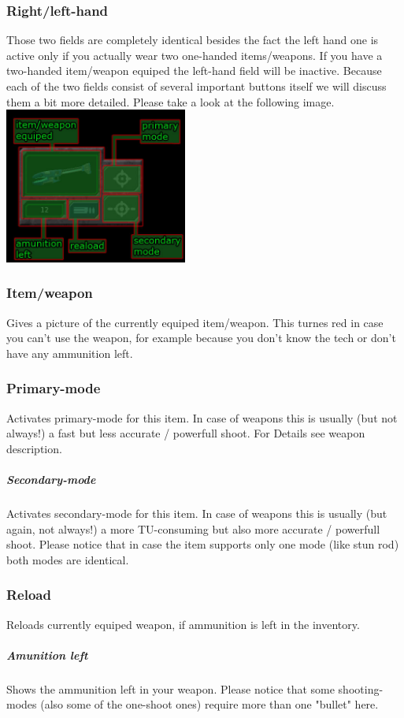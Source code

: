 \subsubsection{Right/left-hand}
Those two fields are completely identical besides the fact the left hand one is active only if you actually wear two one-handed items/weapons. If you have a two-handed item/weapon equiped the left-hand field will be inactive. Because each of the two fields consist of several important buttons itself we will discuss them a bit more detailed. Please take a look at the following image.\\
\includegraphics[width=6cm]{images/HUD_detail_final.jpg}
\subsubsection{Item/weapon}
Gives a picture of the currently equiped item/weapon. This turnes red in case you can't use the weapon, for example because you don't know the tech or don't have any ammunition left.
\subsubsection{Primary-mode}
Activates primary-mode for this item. In case of weapons this is usually (but not always!) a fast but less accurate / powerfull shoot. For Details see weapon description.
\subparagraph{Secondary-mode}
Activates secondary-mode for this item. In case of weapons this is usually (but again, not always!) a more TU-consuming but also more accurate / powerfull shoot. Please notice that in case the item supports only one mode (like stun rod) both modes are identical.
\subsubsection{Reload}
Reloads currently equiped weapon, if ammunition is left in the inventory.
\subparagraph{Amunition left}
Shows the ammunition left in your weapon. Please notice that some shooting-modes (also some of the one-shoot ones) require more than one "bullet" here.

